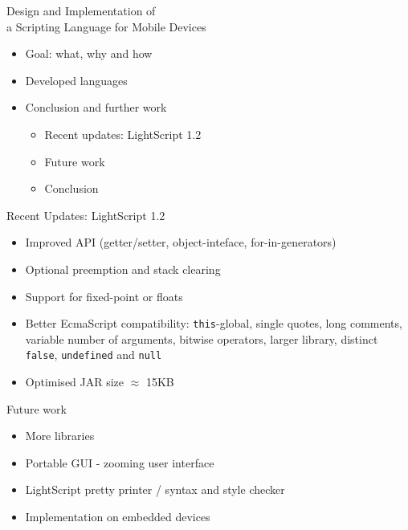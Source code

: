\documentclass[a4paper,landscape]{slides}
\begin{document}
\begin{slide}
        {\large Design and Implementation of \\ a Scripting Language for Mobile Devices \\ \mbox{}}
\begin{itemize}\addtolength{\itemsep}{-\baselineskip}
\item Goal:  what, why and how 
\item Developed languages 
\item Conclusion and further work 
        \begin{itemize}
            \item Recent updates: LightScript 1.2 
            \item Future work
            \item Conclusion 
        \end{itemize}
\end{itemize}
\end{slide}
\begin{slide}
	{\large 
            Recent Updates: LightScript 1.2
	\\ \mbox{}}
	\begin{itemize} \addtolength{\itemsep}{-\baselineskip}
            \item Improved API (getter/setter, object-inteface, for-in-generators)
            \item Optional preemption and stack clearing
            \item Support for fixed-point or floats
            \item Better EcmaScript compatibility: \verb|this|-global, single quotes, long comments, variable number of arguments, bitwise operators, larger library, distinct \verb|false|, \verb|undefined| and \verb|null|
            \item Optimised JAR size $\approx$ 15KB
	\end{itemize}
\end{slide}
\begin{slide}
	{\large 
            Future work
	\\ \mbox{}}
	\begin{itemize}
            \item More libraries
            \item Portable GUI - zooming user interface
            \item LightScript pretty printer / syntax and style checker
            \item Implementation on embedded devices
	\end{itemize}
\end{slide}
\end{document}

